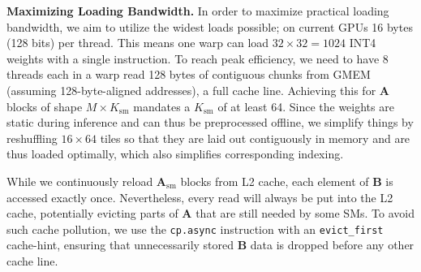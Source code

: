 \documentclass{article}
\theoremstyle{plain}
\theoremstyle{definition}
\theoremstyle{remark}
\newcommand{\code}[1]{\texttt{\small{#1}}}
\renewcommand{\paragraph}[1]{\vspace{0.1em}\noindent\textbf{#1}}
\begin{document}



\paragraph{Maximizing Loading Bandwidth.}
In order to maximize practical loading bandwidth, we aim to utilize the widest loads possible; on current GPUs 16 bytes (128 bits) per thread. This means one warp can load $32 \times 32 = 1024$ INT4 weights with a single instruction. To reach peak efficiency, we need to have 8 threads each in a warp read 128 bytes of contiguous chunks from GMEM (assuming 128-byte-aligned addresses), a full cache line. Achieving this for $\mathbf{A}$ blocks of shape $M \times K_\text{sm}$ mandates a $K_\text{sm}$ of at least 64. Since the weights are static during inference and can thus be preprocessed offline, we simplify things by reshuffling $16 \times 64$ tiles so that they are laid out contiguously in memory and are thus loaded optimally, which also simplifies corresponding indexing.

While we continuously reload $\mathbf{A}_\text{sm}$ blocks from L2 cache, each element of $\mathbf{B}$ is accessed exactly once. Nevertheless, every read will always be put into the L2 cache, potentially evicting parts of $\mathbf{A}$ that are still needed by some SMs. To avoid such cache pollution, we use the \code{cp.async} instruction with an \code{evict\_first} cache-hint, ensuring that unnecessarily stored $\mathbf{B}$ data is dropped before any other cache line.
\end{document}
